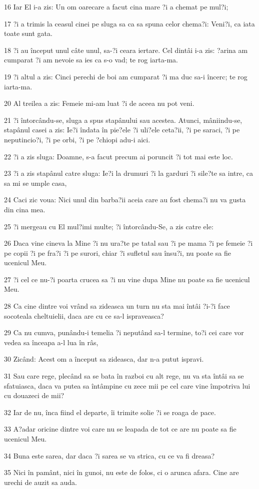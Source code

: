 \par 16 Iar El i-a zis: Un om oarecare a facut cina mare ?i a chemat pe mul?i;
\par 17 ?i a trimis la ceasul cinei pe sluga sa ca sa spuna celor chema?i: Veni?i, ca iata toate sunt gata.
\par 18 ?i au început unul câte unul, sa-?i ceara iertare. Cel dintâi i-a zis: ?arina am cumparat ?i am nevoie sa ies ca s-o vad; te rog iarta-ma.
\par 19 ?i altul a zis: Cinci perechi de boi am cumparat ?i ma duc sa-i încerc; te rog iarta-ma.
\par 20 Al treilea a zis: Femeie mi-am luat ?i de aceea nu pot veni.
\par 21 ?i întorcându-se, sluga a spus stapânului sau acestea. Atunci, mâniindu-se, stapânul casei a zis: Ie?i îndata în pie?ele ?i uli?ele ceta?ii, ?i pe saraci, ?i pe neputincio?i, ?i pe orbi, ?i pe ?chiopi adu-i aici.
\par 22 ?i a zis sluga: Doamne, s-a facut precum ai poruncit ?i tot mai este loc.
\par 23 ?i a zis stapânul catre sluga: Ie?i la drumuri ?i la garduri ?i sile?te sa intre, ca sa mi se umple casa,
\par 24 Caci zic voua: Nici unul din barba?ii aceia care au fost chema?i nu va gusta din cina mea.
\par 25 ?i mergeau cu El mul?imi multe; ?i întorcându-Se, a zis catre ele:
\par 26 Daca vine cineva la Mine ?i nu ura?te pe tatal sau ?i pe mama ?i pe femeie ?i pe copii ?i pe fra?i ?i pe surori, chiar ?i sufletul sau însu?i, nu poate sa fie ucenicul Meu.
\par 27 ?i cel ce nu-?i poarta crucea sa ?i nu vine dupa Mine nu poate sa fie ucenicul Meu.
\par 28 Ca cine dintre voi vrând sa zideasca un turn nu sta mai întâi ?i-?i face socoteala cheltuielii, daca are cu ce sa-l ispraveasca?
\par 29 Ca nu cumva, punându-i temelia ?i neputând sa-l termine, to?i cei care vor vedea sa înceapa a-l lua în râs,
\par 30 Zicând: Acest om a început sa zideasca, dar n-a putut ispravi.
\par 31 Sau care rege, plecând sa se bata în razboi cu alt rege, nu va sta întâi sa se sfatuiasca, daca va putea sa întâmpine cu zece mii pe cel care vine împotriva lui cu douazeci de mii?
\par 32 Iar de nu, înca fiind el departe, îi trimite solie ?i se roaga de pace.
\par 33 A?adar oricine dintre voi care nu se leapada de tot ce are nu poate sa fie ucenicul Meu.
\par 34 Buna este sarea, dar daca ?i sarea se va strica, cu ce va fi dreasa?
\par 35 Nici în pamânt, nici în gunoi, nu este de folos, ci o arunca afara. Cine are urechi de auzit sa auda.

